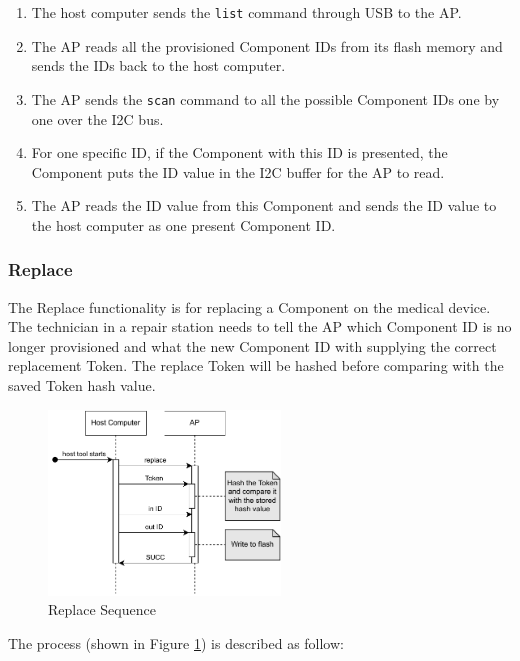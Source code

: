 \documentclass[11pt,oneside,onecolumn,letterpaper]{article}
\begin{document}
	\begin{enumerate}
		\item The host computer sends the \texttt{list} command through USB to the AP.
		\item The AP reads all the provisioned Component IDs from its flash memory and sends the IDs back to the host computer.
		\item The AP sends the \texttt{scan} command to all the possible Component IDs one by one over the I2C bus.
		\item For one specific ID,
		if the Component with this ID is presented,
		the Component puts the ID value in the I2C buffer for the AP to read.
		\item The AP reads the ID value from this Component and sends the ID value to the host computer as one present Component ID.
		
	\end{enumerate}
	
	\subsubsection{Replace}
	The Replace functionality is for replacing a Component on the medical device.
	The technician in a repair station needs to tell the AP which Component ID is no longer provisioned and what the new Component ID with supplying the correct replacement Token.
	The replace Token will be hashed before comparing with the saved Token hash value.
	
	\begin{figure}[h]
		\centering
		\includegraphics[width=0.55\textwidth]{pics/replace.pdf}
		\caption{Replace Sequence}
		\label{fig:functionality_replace}
	\end{figure}
	
	The process (shown in Figure \ref{fig:functionality_replace}) is described as follow:
	
\end{document}

